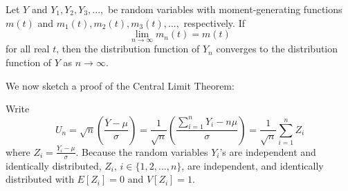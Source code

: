 \documentclass[12pt, a4paper, twoside, openright, titlepage]{book}
\begin{document}
\begin{thm}{}{}
    Let $Y$ and $Y_1,Y_2,Y_3,...,$ be random variables with moment-generating functions $m(t)$ and $m_1(t),m_2(t),m_3(t),...,$ respectively. If \begin{equation*}
        \lim\limits_{n\rightarrow \infty}m_n(t) = m(t)
    \end{equation*}
    for all real $t$, then the distribution function of $Y_n$ converges to the distribution function of $Y$ as $n\rightarrow \infty$.
\end{thm}

We now sketch a proof of the Central Limit Theorem:

\begin{proof*}{}{}
    Write \begin{equation*}
        U_n = \sqrt{n}\left(\frac{\overline{Y}-\mu}{\sigma}\right) = \frac{1}{\sqrt{n}}\left(\frac{\sum_{i=1}^nY_i - n\mu}{\sigma}\right) = \frac{1}{\sqrt{n}}\sum\limits_{i=1}^nZ_i
    \end{equation*}
    where $Z_i = \frac{Y_i - \mu}{\sigma}$. Because the random variables $Y_i$'s are independent and identically distributed, $Z_i$, $i \in \{1,2,...,n\}$, are independent, and identically distributed with $E[Z_i] = 0$ and $V[Z_i] = 1$.


\end{proof*}
\end{document}
